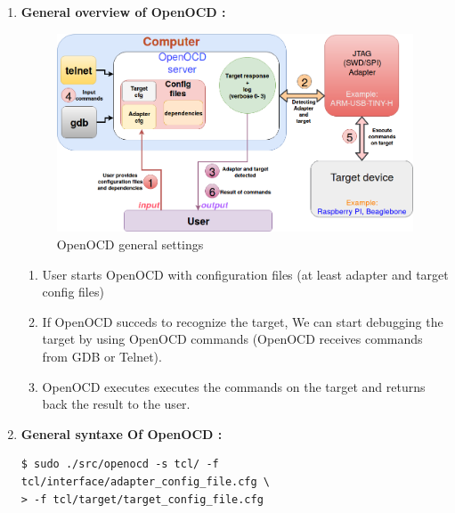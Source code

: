 \begin{enumerate}
	\item \textbf{General overview of OpenOCD : } 
		\begin{figure}[H]
			\centering
        	\includegraphics[scale=0.32]{img/solution/openOCDDiagram.png}
        	\caption{OpenOCD general settings}
        	\label{Navigating through /proc/kcore using gdb}
    	\end{figure}
	
		\begin{enumerate}
			\item {User starts OpenOCD with configuration files (at least adapter and target config files)}
			
			\item {If OpenOCD succeds to recognize the target, We can start debugging the target by using OpenOCD commands (OpenOCD receives commands from GDB or Telnet)}.
			
			\item {OpenOCD executes executes the commands on the target and returns back the result to the user}.
		\end{enumerate}		
	
	\item \textbf{General syntaxe Of OpenOCD : }	
	
	\begin{lstlisting}[style=BashInputStyle]	
$ sudo ./src/openocd -s tcl/ -f tcl/interface/adapter_config_file.cfg \ 
> -f tcl/target/target_config_file.cfg	
	\end{lstlisting}
		

\end{enumerate}
